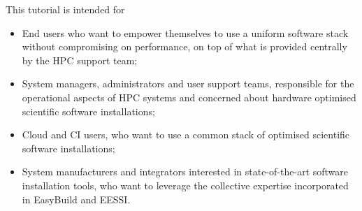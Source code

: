 This tutorial is intended for
\begin{itemize}
    \item End users who want to empower themselves to use a uniform software stack without compromising on
          performance, on top of what is provided centrally by the HPC support team;
    \item System managers, administrators and user support teams, responsible for the operational aspects of HPC systems and concerned about
          hardware optimised scientific software installations;
    \item Cloud and CI users, who want to use a common stack of optimised scientific software installations;
    \item System manufacturers and integrators interested in state-of-the-art software installation tools, who want to
          leverage the collective expertise incorporated in EasyBuild and EESSI.
\end{itemize}
